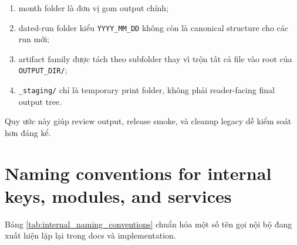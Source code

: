 \begin{enumerate}[label=-]
\item month folder là đơn vị gom output chính;
\item dated-run folder kiểu \texttt{YYYY\_MM\_DD} không còn là canonical structure cho các run mới;
\item artifact family được tách theo subfolder thay vì trộn tất cả file vào root của \texttt{OUTPUT\_DIR/};
\item \texttt{\_staging/} chỉ là temporary print folder, không phải reader-facing final output tree.
\end{enumerate}

Quy ước này giúp review output, release smoke, và cleanup legacy dễ kiểm soát hơn đáng kể.

\section{Naming conventions for internal keys, modules, and services}

Bảng \ref{tab:internal_naming_conventions} chuẩn hóa một số tên gọi nội bộ đang xuất hiện lặp lại trong docs và implementation.

